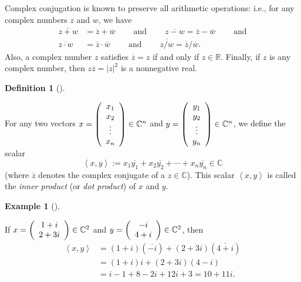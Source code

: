 \documentclass[numbers=enddot,12pt,final,onecolumn,notitlepage]{scrartcl}%
\numberwithin{exer}{subsection}
\theoremstyle{definition}
\newtheorem{defi}[theo]{Definition}
\newenvironment{definition}[1][]
{\begin{defi}[#1]\begin{leftbar}}
{\end{leftbar}\end{defi}}
\newtheorem{exam}[theo]{Example}
\newenvironment{example}[1][]
{\begin{exam}[#1]\begin{leftbar}}
{\end{leftbar}\end{exam}}
\begin{document}
Complex conjugation is known to preserve all arithmetic operations: i.e., for
any complex numbers $z$ and $w$, we have%
\begin{align*}
\overline{z+w}  &  =\overline{z}+\overline{w}\ \ \ \ \ \ \ \ \ \ \text{and}%
\ \ \ \ \ \ \ \ \ \ \overline{z-w}=\overline{z}-\overline{w}%
\ \ \ \ \ \ \ \ \ \ \text{and}\\
\overline{z\cdot w}  &  =\overline{z}\cdot\overline{w}%
\ \ \ \ \ \ \ \ \ \ \text{and}\ \ \ \ \ \ \ \ \ \ \overline{z/w}=\overline
{z}/\overline{w}.
\end{align*}
Also, a complex number $z$ satisfies $\overline{z}=z$ if and only if
$z\in\mathbb{R}$. Finally, if $z$ is any complex number, then $z\overline
{z}=\left\vert z\right\vert ^{2}$ is a nonnegative real.

\begin{definition}
\label{def.unitary.innerprod.innerprod}For any two vectors $x=\left(
\begin{array}
[c]{c}%
x_{1}\\
x_{2}\\
\vdots\\
x_{n}%
\end{array}
\right)  \in\mathbb{C}^{n}$ and $y=\left(
\begin{array}
[c]{c}%
y_{1}\\
y_{2}\\
\vdots\\
y_{n}%
\end{array}
\right)  \in\mathbb{C}^{n}$, we define the scalar%
\begin{equation}
\left\langle x,y\right\rangle :=x_{1}\overline{y_{1}}+x_{2}\overline{y_{2}%
}+\cdots+x_{n}\overline{y_{n}}\in\mathbb{C}
\label{eq.def.unitary.innerprod.innerprod.def}%
\end{equation}
(where $\overline{z}$ denotes the complex conjugate of a $z\in\mathbb{C}$).
This scalar $\left\langle x,y\right\rangle $ is called the \emph{inner
product} (or \emph{dot product}) of $x$ and $y$.
\end{definition}

\begin{example}
If $x=\left(
\begin{array}
[c]{c}%
1+i\\
2+3i
\end{array}
\right)  \in\mathbb{C}^{2}$ and $y=\left(
\begin{array}
[c]{c}%
-i\\
4+i
\end{array}
\right)  \in\mathbb{C}^{2}$, then%
\begin{align*}
\left\langle x,y\right\rangle  &  =\left(  1+i\right)  \left(  \overline
{-i}\right)  +\left(  2+3i\right)  \left(  \overline{4+i}\right) \\
&  =\left(  1+i\right)  i+\left(  2+3i\right)  \left(  4-i\right) \\
&  =i-1+8-2i+12i+3=10+11i.
\end{align*}

\end{example}
\end{document}
